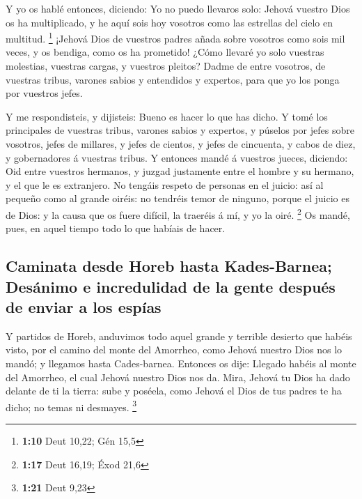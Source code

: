  Y yo os hablé entonces, diciendo: Yo no puedo llevaros
solo:  Jehová vuestro Dios os ha multiplicado, y he aquí
sois hoy vosotros como las estrellas del cielo en multitud. \footnote{\textbf{1:10}
  Deut 10,22; Gén 15,5}  ¡Jehová Dios de vuestros padres
añada sobre vosotros como sois mil veces, y os bendiga, como os ha
prometido!  ¿Cómo llevaré yo solo vuestras molestias,
vuestras cargas, y vuestros pleitos?  Dadme de entre
vosotros, de vuestras tribus, varones sabios y entendidos y expertos,
para que yo los ponga por vuestros jefes.

 Y me respondisteis, y dijisteis: Bueno es hacer lo que has
dicho.  Y tomé los principales de vuestras tribus, varones
sabios y expertos, y púselos por jefes sobre vosotros, jefes de
millares, y jefes de cientos, y jefes de cincuenta, y cabos de diez, y
gobernadores á vuestras tribus.  Y entonces mandé á
vuestros jueces, diciendo: Oid entre vuestros hermanos, y juzgad
justamente entre el hombre y su hermano, y el que le es extranjero.
 No tengáis respeto de personas en el juicio: así al
pequeño como al grande oiréis: no tendréis temor de ninguno, porque el
juicio es de Dios: y la causa que os fuere difícil, la traeréis á mí, y
yo la oiré. \footnote{\textbf{1:17} Deut 16,19; Éxod 21,6} 
Os mandé, pues, en aquel tiempo todo lo que habíais de hacer.

\hypertarget{caminata-desde-horeb-hasta-kades-barnea-desuxe1nimo-e-incredulidad-de-la-gente-despuuxe9s-de-enviar-a-los-espuxedas}{%
\subsection{Caminata desde Horeb hasta Kades-Barnea; Desánimo e
incredulidad de la gente después de enviar a los
espías}\label{caminata-desde-horeb-hasta-kades-barnea-desuxe1nimo-e-incredulidad-de-la-gente-despuuxe9s-de-enviar-a-los-espuxedas}}

 Y partidos de Horeb, anduvimos todo aquel grande y
terrible desierto que habéis visto, por el camino del monte del
Amorrheo, como Jehová nuestro Dios nos lo mandó; y llegamos hasta
Cades-barnea.  Entonces os dije: Llegado habéis al monte
del Amorrheo, el cual Jehová nuestro Dios nos da.  Mira,
Jehová tu Dios ha dado delante de ti la tierra: sube y poséela, como
Jehová el Dios de tus padres te ha dicho; no temas ni desmayes.
\footnote{\textbf{1:21} Deut 9,23}

